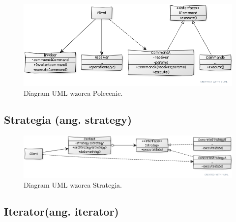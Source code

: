 \begin{figure}[hbt!]
	\centering
	\includegraphics[width=0.9\linewidth]{images/CommandUml}
	\caption{Diagram UML wzorca Polecenie.}
	\label{lab2/fig/AbstractFactoryUml}
\end{figure}
%



\subsection{Strategia (ang. strategy)}

\begin{figure}[hbt!]
	\centering
	\includegraphics[width=0.9\linewidth]{images/StrategyUml}
	\caption{Diagram UML wzorca Strategia.}
	\label{lab2/fig/AbstractFactoryUml}
\end{figure}
%

\subsection{Iterator(ang. iterator)}
